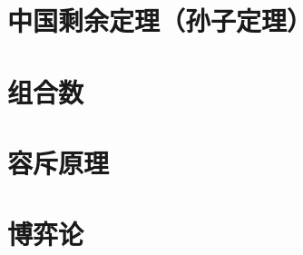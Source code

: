 \documentclass[]{book}
\begin{document}
\chapter{中国剩余定理（孙子定理）}

\chapter{组合数}

\chapter{容斥原理}

\chapter{博弈论}
\end{document}
